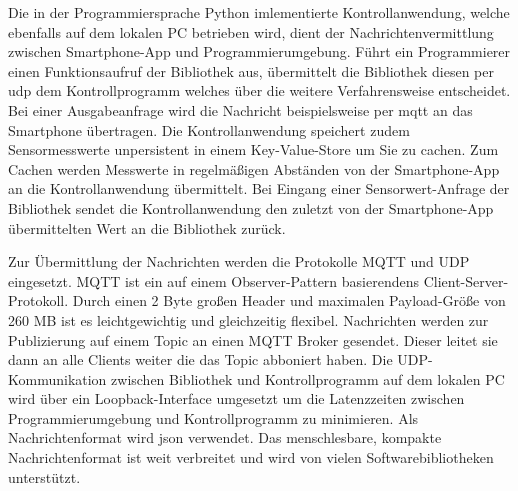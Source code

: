 \documentclass[11pt,a4paper]{report}
\begin{document}
Die in der Programmiersprache Python imlementierte Kontrollanwendung, welche ebenfalls auf dem lokalen PC betrieben wird, dient der Nachrichtenvermittlung zwischen Smartphone-App und Programmierumgebung.
Führt ein Programmierer einen Funktionsaufruf der Bibliothek aus, übermittelt die Bibliothek diesen per \acrshort{udp} dem Kontrollprogramm welches über die weitere Verfahrensweise entscheidet.
Bei einer Ausgabeanfrage wird die Nachricht beispielsweise per \acrshort{mqtt} an das Smartphone übertragen.
Die Kontrollanwendung speichert zudem Sensormesswerte unpersistent in einem Key-Value-Store um Sie zu cachen.
Zum Cachen werden Messwerte in regelmäßigen Abständen von der Smartphone-App an die Kontrollanwendung übermittelt.
Bei Eingang einer Sensorwert-Anfrage der Bibliothek sendet die Kontrollanwendung den zuletzt von der Smartphone-App übermittelten Wert an die Bibliothek zurück.

Zur Übermittlung der Nachrichten werden die Protokolle MQTT und UDP eingesetzt.
MQTT ist ein auf einem Observer-Pattern basierendens Client-Server-Protokoll.
Durch einen 2 Byte großen Header und maximalen Payload-Größe von 260 MB ist es leichtgewichtig und gleichzeitig flexibel.
Nachrichten werden zur Publizierung auf einem Topic an einen MQTT Broker gesendet.
Dieser leitet sie dann an alle Clients weiter die das Topic abboniert haben.
Die UDP-Kommunikation zwischen Bibliothek und Kontrollprogramm auf dem lokalen PC wird über ein Loopback-Interface umgesetzt um die Latenzzeiten zwischen Programmierumgebung und Kontrollprogramm zu minimieren.
Als Nachrichtenformat wird \acrshort{json} verwendet.
Das menschlesbare, kompakte Nachrichtenformat ist weit verbreitet und wird von vielen Softwarebibliotheken unterstützt.
\end{document}
